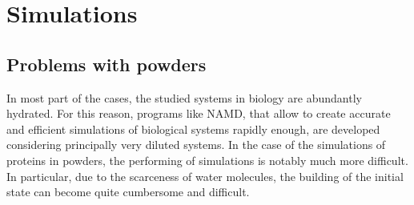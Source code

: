 \section{Simulations}
\subsection{Problems with powders}
In most part of the cases, the studied systems in biology are abundantly hydrated. For this reason, programs like NAMD, that allow to create accurate and efficient simulations of biological systems rapidly enough, are developed considering principally very diluted systems. In the case of the simulations of proteins in powders, the performing of simulations is notably much more difficult. In particular, due to the scarceness of water molecules, the building of the initial state can become quite cumbersome and difficult.

